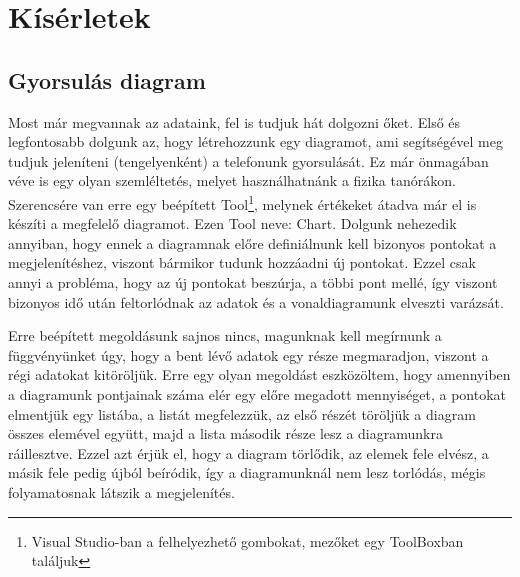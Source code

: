 \documentclass{thesis-ekf}
\theoremstyle{definition}
\theoremstyle{remark}
\begin{document}
\section{Kísérletek}
\subsection{Gyorsulás diagram}
Most már megvannak az adataink, fel is tudjuk hát dolgozni őket. Első és legfontosabb dolgunk az, hogy létrehozzunk egy diagramot, ami segítségével meg tudjuk jeleníteni (tengelyenként) a telefonunk gyorsulását. Ez már önmagában véve is egy olyan szemléltetés, melyet használhatnánk a fizika tanórákon. Szerencsére van erre egy beépített Tool\footnote{Visual Studio-ban a felhelyezhető gombokat, mezőket egy ToolBoxban találjuk}, melynek értékeket átadva már el is készíti a megfelelő diagramot. Ezen Tool neve: Chart. Dolgunk nehezedik annyiban, hogy ennek a diagramnak előre definiálnunk kell bizonyos pontokat a megjelenítéshez, viszont bármikor tudunk hozzáadni új pontokat. Ezzel csak annyi a probléma, hogy az új pontokat beszúrja, a többi pont mellé, így viszont bizonyos idő után feltorlódnak az adatok és a vonaldiagramunk elveszti varázsát. 
\par Erre beépített megoldásunk sajnos nincs, magunknak kell megírnunk a függvényünket úgy, hogy a bent lévő adatok egy része megmaradjon, viszont a régi adatokat kitöröljük. Erre egy olyan megoldást eszközöltem, hogy amennyiben a diagramunk pontjainak száma elér egy előre megadott mennyiséget, a pontokat elmentjük egy listába, a listát megfelezzük, az első részét töröljük a diagram összes elemével együtt, majd a lista második része lesz a diagramunkra ráillesztve. Ezzel azt érjük el, hogy a diagram törlődik, az elemek fele elvész, a másik fele pedig újból beíródik, így a diagramunknál nem lesz torlódás, mégis folyamatosnak látszik a megjelenítés.
\end{document}
